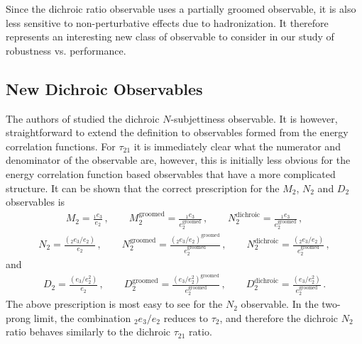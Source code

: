 \documentclass[11pt,letterpaper]{article}
\newcommand{\groomed}{\text{groomed}}
\newcommand{\ecfnobeta}[1]{e_{#1}}
\newcommand{\ecfvarnobeta}[2]{{_{#1}e_{#2}}}
\begin{document}
Since the dichroic ratio observable uses a partially groomed observable, it is also less sensitive to non-perturbative effects due to hadronization. It therefore represents an interesting new class of observable to consider in our study of robustness vs. performance. 







\subsection{New Dichroic Observables}\label{sec:dichroic_new}

The authors of \cite{Salam:2016yht} studied the dichroic $N$-subjettiness observable. It is however, straightforward to extend the definition to observables formed from the energy correlation functions. For $\tau_{21}$ it is immediately clear what the numerator and denominator of the observable are, however, this is initially less obvious for the energy correlation function based observables that have a more complicated structure. It can be shown that the correct prescription for the $M_2$, $N_2$ and $D_2$ observables is
\begin{align}
M_2= \frac{ \ecfvarnobeta{1}{3}  }{\ecfnobeta{2}}\,, \qquad  M_2^{\text{groomed}}= \frac{ \ecfvarnobeta{1}{3}  }{\ecfnobeta{2}^\groomed}\,, \qquad  N_2^{\text{dichroic}}= \frac{\ecfvarnobeta{1}{3}  }{\ecfnobeta{2}^\groomed}\,, 
\end{align}
\begin{align}
N_2= \frac{\left( \ecfvarnobeta{2}{3} / \ecfnobeta{2} \right) }{\ecfnobeta{2}}\,, \qquad  N_2^{\text{groomed}}= \frac{\left( \ecfvarnobeta{2}{3} / \ecfnobeta{2} \right)^\groomed }{\ecfnobeta{2}^\groomed}\,, \qquad  N_2^{\text{dichroic}}= \frac{\left( \ecfvarnobeta{2}{3} / \ecfnobeta{2} \right) }{\ecfnobeta{2}^\groomed}\,, 
\end{align}
and
\begin{align}
D_2=\frac{\left( \ecfnobeta{3} / \ecfnobeta{2}^2 \right)}{ \ecfnobeta{2}}\,, \qquad D_2^{\text{groomed}}=\frac{\left( \ecfnobeta{3} / \ecfnobeta{2}^2 \right)^\groomed}{ \ecfnobeta{2}^\groomed}\,, \qquad D_2^{\text{dichroic}}=\frac{\left( \ecfnobeta{3} / \ecfnobeta{2}^2 \right)}{ \ecfnobeta{2}^\groomed}\,.
\end{align}
The above prescription is most easy to see for the $N_2$ observable. In the two-prong limit, the combination $ \ecfvarnobeta{2}{3} / \ecfnobeta{2} $ reduces to $\tau_2$, and therefore the dichroic $N_2$ ratio behaves similarly to the dichroic $\tau_{21}$ ratio.
\end{document}
